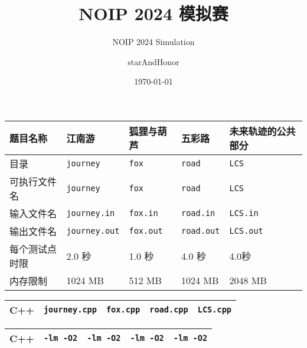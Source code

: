 \documentclass{statement}
\title{NOIP 2024 模拟赛}
\subtitle{NOIP 2024 Simulation}
\author{starAndHonor}
\date{\today}
\begin{document}
    \begin{titlingpage}
        \maketitle
        \begin{center}
        \begin{tabularx}{\textwidth}{|X|X|X|X|X|}
        \hline
            题目名称 & 江南游 & 狐狸与葫芦 & 五彩路 &未来轨迹的公共部分 \\
        \hline
            目录 & \texttt{journey} & \texttt{fox} & \texttt{road} & \texttt{LCS}\\
        \hline
            可执行文件名 & \texttt{journey} & \texttt{fox} & \texttt{road} & \texttt{LCS}\\
        \hline
            输入文件名 & \texttt{journey.in} & \texttt{fox.in} & \texttt{road.in} & \texttt{LCS.in}\\
        \hline
            输出文件名 & \texttt{journey.out} & \texttt{fox.out} & \texttt{road.out} &  \texttt{LCS.out}\\
        \hline
            每个测试点时限 & 2.0 秒 & 1.0 秒 & 4.0 秒 & 4.0秒\\
        \hline
            内存限制 & 1024 MB & 512 MB & 1024 MB & 2048 MB\\
        \hline
        \end{tabularx}\par
        \end{center}
        
        \begin{center}
        \begin{tabularx}{\textwidth}{|X|X|X|X|X|}
        \hline
             C++  & \texttt{journey.cpp} & \texttt{fox.cpp} & \texttt{road.cpp} & \texttt{LCS.cpp}\\
        \hline
        \end{tabularx}\par
        \end{center}
        
        \begin{center}
        \begin{tabularx}{\textwidth}{|X|X|X|X|X|}
        \hline
            C++ & \texttt{-lm -O2} & \texttt{-lm -O2} & \texttt{-lm -O2} & \texttt{-lm -O2}\\
        \hline
        \end{tabularx}\par
        \end{center}


\end{titlingpage}
\end{document}
